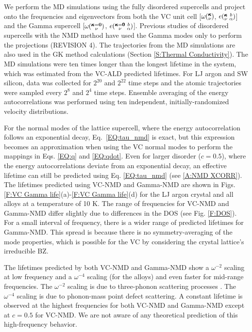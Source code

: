 \documentclass[aps,prb,onecolumn,preprint,footinbib,superscriptaddress,amsmath,amssymb,floatfix]{revtex4}
\newcommand{\kvba}{\mspace{-4.0mu}\left(\mspace{-8.0mu}
\begin{smallmatrix} &\pmb{\kappa} &b \\ &\nu &\alpha\end{smallmatrix}
\mspace{-3.0mu}\right)}
\newcommand{\kgvba}{\mspace{-4.0mu}\left(\mspace{-8.0mu}
\begin{smallmatrix} &\pmb{\kappa}=\pmb{0} &b \\ &\nu 
&\alpha\end{smallmatrix}\mspace{-3.0mu}\right)}
\newcommand{\kv}{\mspace{-4.0mu}\left(\mspace{-8.0mu}
\begin{smallmatrix}&\pmb{\kappa} \\&\nu\end{smallmatrix}
\mspace{-3.0mu}\right)}
\newcommand{\kgv}{\mspace{-4.0mu}\left(\mspace{-8.0mu}
\begin{smallmatrix}&\pmb{\kappa}=\mathbf{0} \\&\nu\end{smallmatrix}
\mspace{-3.0mu}\right)}
\begin{document}
We perform the MD simulations using the fully disordered supercells  
and project onto the frequencies and eigenvectors 
from both the VC unit cell [$\omega\kv$, $e\kvba$] and the 
Gamma supercell [$\omega\kgv$, $e\kgvba$]. Previous studies of 
disordered supercells with the 
NMD method have used the Gamma modes only to perform the projections (REVISION 4).
\cite{donadio_atomistic_2009,he_heat_2011,he_morphology_2011,
he_lattice_2012,hori_phonon_2013} 
The trajectories from 
the MD simulations are also used in the GK method calculations
(Section \ref{S:Thermal Conductivity}).
The MD simulations were ten times longer than the 
longest lifetime in the system, which was  
estimated from the VC-ALD predicted lifetimes. For LJ 
argon and SW silicon, data was collected for $2^{20}$ and 
$2^{22}$ time steps and the atomic trajectories were sampled 
every $2^8$ and $2^4$ time steps. 
Ensemble averaging of the energy autocorrelations was performed 
using ten independent, initially-randomized velocity distributions. 

For the normal modes of the lattice supercell, where the energy 
autocorrelation follows an 
exponential decay,\cite{ladd_lattice_1986,turney_predicting_2009-1} 
Eq.~\eqref{EQ:tau_nmd} is exact, but this expression becomes an 
approximation when 
using the VC normal modes to perform the mappings in Eqs.  
\eqref{EQ:q} and \eqref{EQ:qdot}. 
Even for larger disorder ($c=0.5$),  
where the energy autocorrelations 
deviate from an exponential decay, 
an effective lifetime can still be predicted 
using Eq. \eqref{EQ:tau_nmd} (see \ref{A:NMD XCORR}). 
The lifetimes predicted using VC-NMD and Gamma-NMD  
are shown in Figs. \ref{F:VC Gamma life}(a)-\ref{F:VC Gamma life}(d) 
for the LJ argon crystal and all alloys at a temperature of 10 K. 
The range of frequencies for 
VC-NMD and Gamma-NMD differ slightly due to differences in 
the DOS (see Fig. \ref{F:DOS}). 
For a small interval of frequency, there is a wider range of 
predicted lifetimes for Gamma-NMD. This spread is because there 
is no symmetry-averaging of the mode properties, 
which is possible for the VC by considering the crystal 
lattice's irreducible BZ.\cite{ashcroft_solid_1976} 

The lifetimes predicted by both VC-NMD and Gamma-NMD 
show a $\omega^{-2}$ scaling at low frequency and a $\omega^{-4}$ 
scaling (for the alloys) and 
even faster for mid-range frequencies. The $\omega^{-2}$ scaling 
is due to three-phonon scattering processes
\cite{callaway_model_1959,maradudin_scattering_1962}. The 
$\omega^{-4}$ scaling is due to phonon-mass point defect 
scattering.\cite{klemens_scattering_1955,klemens_thermal_1957,mattis_phonon_1957,tamura_isotope_1983} 
A constant lifetime is observed at the highest frequencies  
for both VC-NMD and Gamma-NMD except at $c=0.5$ for VC-NMD. We are not 
aware of any theoretical prediction of this high-frequency behavior.
\end{document}
